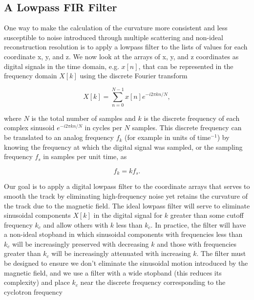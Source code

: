 \documentclass{JINST}
\begin{document}
\subsection{A Lowpass FIR Filter}\label{ssec:FIR}
One way to make the calculation of the curvature more consistent and less susceptible to noise introduced through 
multiple scattering and non-ideal reconstruction resolution is to apply a lowpass filter to the lists of values for each 
coordinate x, y, and z.  We now look at the arrays of x, y, and z coordinates as digital signals in the time
domain, e.g. $x[n]$, that can be represented in the frequency domain $X[k]$ using the discrete Fourier transform

\begin{equation}
X[k] = \sum_{n=0}^{N-1}x[n]e^{-i2\pi kn/N},
\end{equation}

\noindent where $N$ is the total number of samples and $k$ is the discrete frequency of each complex
sinusoid $e^{-i2\pi kn/N}$ in cycles per $N$ samples.  This discrete frequency can be translated to an analog
frequency $f_{k}$ (for example in units of time$^{-1}$) by knowing the frequency at which the digital signal was
sampled, or the sampling frequency $f_{s}$ in samples per unit time, as

\begin{equation}
f_{k} = kf_{s}.
\end{equation}

Our goal is to apply a digital lowpass filter to the coordinate arrays that serves to
smooth the track by eliminating high-frequency noise yet retains the curvature of the track
due to the magnetic field.  The ideal lowpass filter will serve to eliminate sinusoidal components
$X[k]$ in the digital signal for $k$ greater than some cutoff frequency $k_{c}$ and allow 
others with $k$ less than $k_{c}$.  In practice, the filter will have a non-ideal stopband in which sinusoidal 
components with frequencies less than $k_{c}$ will be increasingly preserved with decreasing $k$ and those 
with frequencies greater than $k_{c}$ will be increasingly attenuated with increasing $k$.  The filter must be designed 
to ensure we don't eliminate the sinusoidal motion introduced by the magnetic field, and we use a
filter with a wide stopband (this reduces its complexity) and place $k_{c}$ near the discrete frequency corresponding
to the cyclotron frequency

\end{document}
